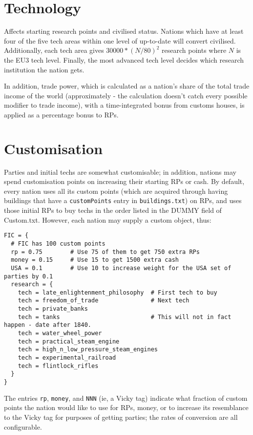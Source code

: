 \documentclass[12pt]{article}
\begin{document}
\section{Technology}

Affects starting research points and civilised status. Nations which
have at least four of the five tech areas within one level of
up-to-date will convert civilised. Additionally, each tech area gives
$30000*(N/80)^2$ research points where $N$ is the EU3 tech
level. Finally, the most advanced tech level decides which research
institution the nation gets. 

In addition, trade power, which is calculated as a nation's share of
the total trade income of the world (approximately - the calculation
doesn't catch every possible modifier to trade income), with a
time-integrated bonus from customs houses, is applied as a percentage
bonus to RPs. 

\section{Customisation}

Parties and initial techs are somewhat customisable; in addition,
nations may spend customisation points on increasing their starting
RPs or cash. By default, every nation uses all its custom points
(which are acquired through having buildings that have a
\verb|customPoints| entry in \verb|buildings.txt|) on RPs, and uses
those initial RPs to buy techs in the order listed in the DUMMY field
of Custom.txt. However, each nation may supply a custom object, thus:
\begin{verbatim}
FIC = {
  # FIC has 100 custom points
  rp = 0.75        # Use 75 of them to get 750 extra RPs
  money = 0.15     # Use 15 to get 1500 extra cash
  USA = 0.1        # Use 10 to increase weight for the USA set of parties by 0.1
  research = {
    tech = late_enlightenment_philosophy  # First tech to buy
    tech = freedom_of_trade               # Next tech
    tech = private_banks
    tech = tanks                          # This will not in fact happen - date after 1840. 
    tech = water_wheel_power
    tech = practical_steam_engine
    tech = high_n_low_pressure_steam_engines
    tech = experimental_railroad
    tech = flintlock_rifles
  }
}
\end{verbatim}
The entries \texttt{rp}, \texttt{money}, and \texttt{NNN} (ie, a Vicky
tag) indicate what fraction of custom points the nation would like to
use for RPs, money, or to increase its resemblance to the Vicky tag
for purposes of getting parties; the rates of conversion are all
configurable. 
\end{document}
